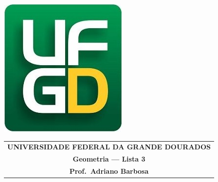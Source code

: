 \documentclass[a4paper,5pt]{amsbook}
\begin{document}
\thispagestyle{empty}
\pagestyle{empty}
\begin{minipage}[h]{0.14\textwidth}
	\includegraphics[scale=0.24]{../../ufgd.png}
\end{minipage}
\begin{minipage}[h]{\textwidth}
\begin{tabular}{c}
{{\bf UNIVERSIDADE FEDERAL DA GRANDE DOURADOS}}\\
{{\bf Geometria --- Lista 3}}\\
{{\bf Prof.\ Adriano Barbosa}}\\
\end{tabular}
\vspace{-0.45cm}
%
\end{minipage}

\end{document}
